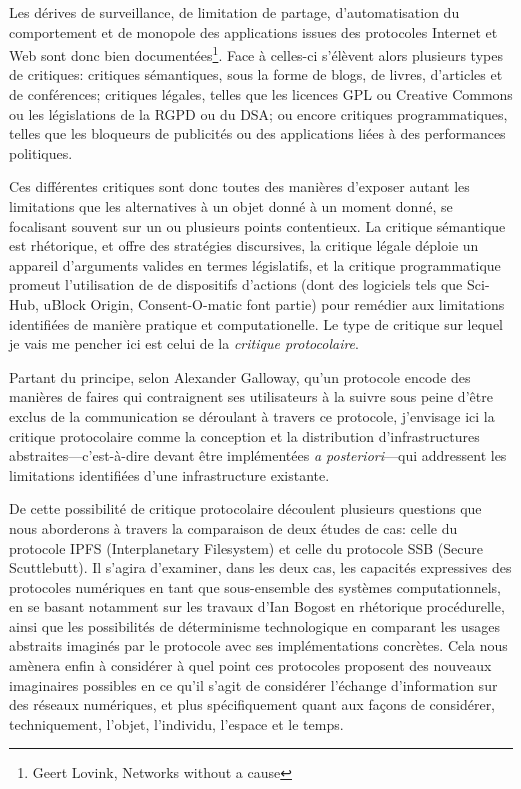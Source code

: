\documentclass{article}
\begin{document}
Les dérives de surveillance, de limitation de partage, d'automatisation du comportement et de monopole des applications issues des protocoles Internet et Web sont donc bien documentées\footnote{Geert Lovink, Networks without a cause}. Face à celles-ci s'élèvent alors plusieurs types de critiques: critiques sémantiques, sous la forme de blogs, de livres, d'articles et de conférences; critiques légales, telles que les licences GPL ou Creative Commons\cite{elkin-koren_creative_2006} ou les législations de la RGPD ou du DSA; ou encore critiques programmatiques, telles que les bloqueurs de publicités\cite{gupta_block_2020} ou des applications liées à des performances politiques\cite{critical_art_ensemble_electronic_1996}.

Ces différentes critiques sont donc toutes des manières d'exposer autant les limitations que les alternatives à un objet donné à un moment donné, se focalisant souvent sur un ou plusieurs points contentieux. La critique sémantique est rhétorique, et offre des stratégies discursives, la critique légale déploie un appareil d'arguments valides en termes législatifs, et la critique programmatique promeut l'utilisation de de dispositifs d'actions (dont des logiciels tels que Sci-Hub, uBlock Origin, Consent-O-matic font partie) pour remédier aux limitations identifiées de manière pratique et computationelle. Le type de critique sur lequel je vais me pencher ici est celui de la \emph{critique protocolaire}.

Partant du principe, selon Alexander Galloway, qu'un protocole encode des manières de faires qui contraignent ses utilisateurs à la suivre sous peine d'être exclus de la communication se déroulant à travers ce protocole\cite{galloway_protocol_2004}, j'envisage ici la critique protocolaire comme la conception et la distribution d'infrastructures abstraites—c'est-à-dire devant être implémentées \emph{a posteriori}—qui addressent les limitations identifiées d'une infrastructure existante.

De cette possibilité de critique protocolaire découlent plusieurs questions que nous aborderons à travers la comparaison de deux études de cas: celle du protocole IPFS (Interplanetary Filesystem) et celle du protocole SSB (Secure Scuttlebutt). Il s'agira d'examiner, dans les deux cas, les capacités expressives des protocoles numériques en tant que sous-ensemble des systèmes computationnels, en se basant notamment sur les travaux d'Ian Bogost en rhétorique procédurelle\cite{bogost_persuasive_2010}, ainsi que les possibilités de déterminisme technologique en comparant les usages abstraits imaginés par le protocole avec ses implémentations concrètes. Cela nous amènera enfin à considérer à quel point ces protocoles proposent des nouveaux imaginaires possibles en ce qu'il s'agit de considérer l'échange d'information sur des réseaux numériques, et plus spécifiquement quant aux façons de considérer, techniquement, l'objet, l'individu, l'espace et le temps.
\end{document}

